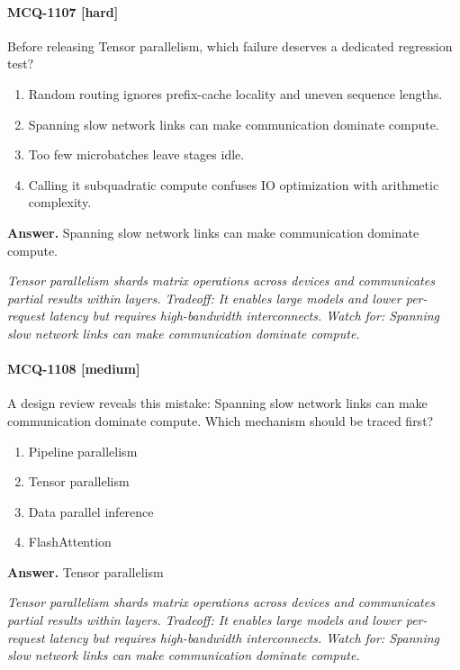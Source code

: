 \paragraph{MCQ-1107 [hard]} Before releasing Tensor parallelism, which failure deserves a dedicated regression test?
\begin{enumerate}[label=\Alph*.]
\item Random routing ignores prefix-cache locality and uneven sequence lengths.
\item Spanning slow network links can make communication dominate compute.
\item Too few microbatches leave stages idle.
\item Calling it subquadratic compute confuses IO optimization with arithmetic complexity.
\end{enumerate}
\noindent\textbf{Answer.} Spanning slow network links can make communication dominate compute.
\par\textit{Tensor parallelism shards matrix operations across devices and communicates partial results within layers. Tradeoff: It enables large models and lower per-request latency but requires high-bandwidth interconnects. Watch for: Spanning slow network links can make communication dominate compute.}
\paragraph{MCQ-1108 [medium]} A design review reveals this mistake: Spanning slow network links can make communication dominate compute. Which mechanism should be traced first?
\begin{enumerate}[label=\Alph*.]
\item Pipeline parallelism
\item Tensor parallelism
\item Data parallel inference
\item FlashAttention
\end{enumerate}
\noindent\textbf{Answer.} Tensor parallelism
\par\textit{Tensor parallelism shards matrix operations across devices and communicates partial results within layers. Tradeoff: It enables large models and lower per-request latency but requires high-bandwidth interconnects. Watch for: Spanning slow network links can make communication dominate compute.}

